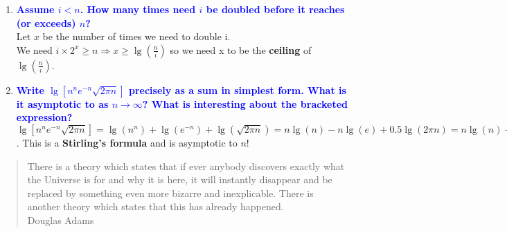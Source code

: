 \documentclass[11pt]{article}
\begin{document}
\begin{enumerate}
\begin{enumerate}
        \\ Now $\frac{\log(3)}{\log(2)} \approx 1.585$ so $\lg(n)$ is $\approx$ 1.58 times the value of $\log_3(n)$.
    \item \textbf{\textcolor{blue}{Assume $i< n$.  How many times need $i$ be doubled before it reaches (or exceeds) $n$?}}
        \\ Let $x$ be the number of times we need to double i.
        \\ We need $i \times 2^x \geq n \Rightarrow x \geq \lg(\frac{n}{i})$ so we need x to be the \textbf{ceiling} of $\lg(\frac{n}{i})$.
    \item \textbf{\textcolor{blue}{Write $\lg[n^ne^{-n}\sqrt{2\pi n}]$ precisely as a sum in simplest form.  What is it asymptotic to as $n \rightarrow \infty$?  What is interesting about the bracketed expression?}}
        \\ $\lg[n^ne^{-n}\sqrt{2\pi n}] = \lg(n^n) + \lg(e^{-n}) + \lg(\sqrt{2\pi n}) = n\lg(n) - n\lg(e) + 0.5\lg(2\pi n) = n\lg(n) - n\lg(e) + 0.5\lg(2\pi) + 0.5\lg(n)$. This is a \textbf{Stirling's formula} and is asymptotic to $n!$
    \end{enumerate}
\end{enumerate}

\begin{quote}
There is a theory which states that if ever anybody discovers exactly what
the Universe is for and why it is here, it will instantly disappear and be
replaced by something even more bizarre and inexplicable. There is another
theory which states that this has already happened.
\\ Douglas Adams
\end{quote}
\end{document}

